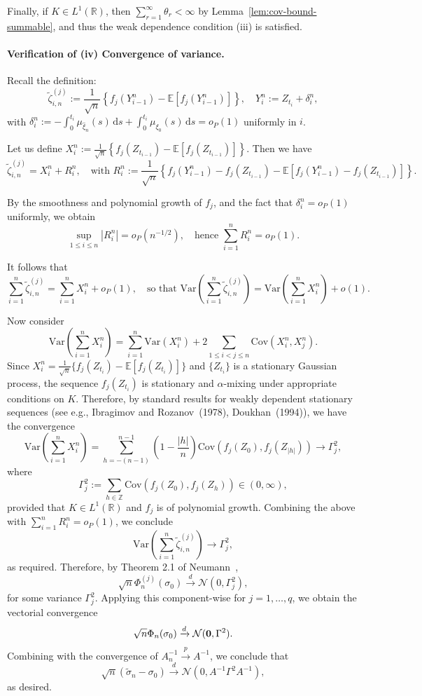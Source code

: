 \documentclass[a4paper,10pt,twoside]{article}
\numberwithin{equation}{section}
\def\l{\left}
\def\r{\right}
\def\s{\sigma}
\def\toP{\stackrel{p}{\longrightarrow}}
\def\E{\mathbb{E}}
\def\mb#1{\mbox{\boldmath $#1$}}
\def\wt#1{\widetilde{#1}}
\def\Var{\mathrm{Var}}
\def\Cov{\mathrm{Cov}}
\def\df{\mathrm{d}}
\begin{document}
Finally, if $K \in L^1(\mathbb{R})$, then $\sum_{r=1}^\infty \theta_r < \infty$ by Lemma~\ref{lem:cov-bound-summable}, and thus the weak dependence condition (iii) is satisfied.

\paragraph{Verification of (iv) Convergence of variance.}
Recall the definition:
\[
\widetilde{\zeta}_{i,n}^{(j)} := \frac{1}{\sqrt{n}} \l\{ f_j(Y_{i-1}^n) - \E[f_j(Y_{i-1}^n)] \r\}, \quad Y_i^n := Z_{t_i} + \delta_i^n,
\]
with $\delta_i^n := -\int_0^{t_i} \mu_{\widehat{\xi}_n}(s) \,\df s + \int_0^{t_i} \mu_{\xi_0}(s) \,\df s = o_P(1)$ uniformly in $i$.

Let us define $X_i^n := \frac{1}{\sqrt{n}} \l\{ f_j(Z_{t_{i-1}}) - \E[f_j(Z_{t_{i-1}})] \r\}$. Then we have
\[
\widetilde{\zeta}_{i,n}^{(j)} = X_i^n + R_i^n, \quad \text{with } R_i^n := \frac{1}{\sqrt{n}} \l\{ f_j(Y_{i-1}^n) - f_j(Z_{t_{i-1}}) - \E[f_j(Y_{i-1}^n) - f_j(Z_{t_{i-1}})] \r\}.
\]

By the smoothness and polynomial growth of $f_j$, and the fact that $\delta_i^n = o_P(1)$ uniformly, we obtain
\[
\sup_{1 \le i \le n} |R_i^n| = o_P(n^{-1/2}),
\quad \text{hence } \sum_{i=1}^n R_i^n = o_P(1).
\]

It follows that
\[
\sum_{i=1}^n \widetilde{\zeta}_{i,n}^{(j)} = \sum_{i=1}^n X_i^n + o_P(1),
\quad \text{so that } \Var\l( \sum_{i=1}^n \widetilde{\zeta}_{i,n}^{(j)} \r)
= \Var\l( \sum_{i=1}^n X_i^n \r) + o(1).
\]

Now consider
\[
\Var\l( \sum_{i=1}^n X_i^n \r)
= \sum_{i=1}^n \Var(X_i^n) + 2 \sum_{1 \le i < j \le n} \Cov(X_i^n, X_j^n).
\]
Since $X_i^n = \frac{1}{\sqrt{n}} \{ f_j(Z_{t_i}) - \E[f_j(Z_{t_i})] \}$ and $\{ Z_{t_i} \}$ is a stationary Gaussian process, the sequence $f_j(Z_{t_i})$ is stationary and $\alpha$-mixing under appropriate conditions on $K$.
Therefore, by standard results for weakly dependent stationary sequences (see e.g., Ibragimov and Rozanov~(1978), Doukhan~(1994)), we have the convergence
\[
\Var\l( \sum_{i=1}^n X_i^n \r)
= \sum_{h = -(n-1)}^{n-1} \l(1 - \frac{|h|}{n}\r) \Cov\l( f_j(Z_0), f_j(Z_{|h|}) \r) \to \Gamma_{j}^2,
\]
where
\[
\Gamma_{j}^2 := \sum_{h \in \mathbb{Z}} \Cov\l( f_j(Z_0), f_j(Z_h) \r) \in (0,\infty),
\]
provided that $K \in L^1(\mathbb{R})$ and $f_j$ is of polynomial growth.
Combining the above with $\sum_{i=1}^n R_i^n = o_P(1)$, we conclude
\[
\Var\l( \sum_{i=1}^n \widetilde{\zeta}_{i,n}^{(j)} \r) \to \Gamma_{j}^2,
\]
as required. Therefore, by Theorem 2.1 of Neumann~\cite{n13},
\[
\sqrt{n} \Phi_n^{(j)}(\sigma_0) \xrightarrow{d} \mathcal{N}(0, \Gamma_{j}^2),
\]
for some variance $\Gamma_{j}^2$. Applying this component-wise for $j=1,\dots,q$, we obtain the vectorial convergence
\[
\sqrt{n} \Phi_n(\sigma_0) \xrightarrow{d} \mathcal{N}(\mb{0}, \Gamma^2).
\]
Combining with the convergence of $A_n^{-1} \toP A^{-1}$, we conclude that
\[
\sqrt{n}(\wt{\s}_n - \sigma_0) \xrightarrow{d} \mathcal{N}(0, A^{-1} \Gamma^2 A^{-1}),
\]
as desired.
\end{document}
